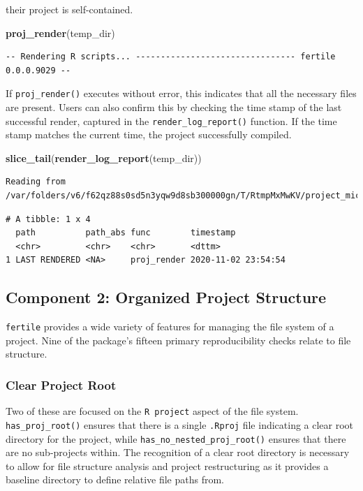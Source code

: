 \documentclass[12pt,twoside]{reedthesis}
\newenvironment{Shaded}{\begin{snugshade}}{\end{snugshade}}
\newcommand{\KeywordTok}[1]{\textcolor[rgb]{0.13,0.29,0.53}{\textbf{#1}}}
\newcommand{\NormalTok}[1]{#1}
\begin{document}
their project is self-contained.
\begin{Shaded}
\begin{Highlighting}[]
\KeywordTok{proj_render}\NormalTok{(temp_dir)}
\end{Highlighting}
\end{Shaded}
\begin{verbatim}
-- Rendering R scripts... -------------------------------- fertile 0.0.0.9029 --
\end{verbatim}
If \texttt{proj\_render()} executes without error, this indicates that
all the necessary files are present. Users can also confirm this by
checking the time stamp of the last successful render, captured in the
\texttt{render\_log\_report()} function. If the time stamp matches the
current time, the project successfully compiled.
\begin{Shaded}
\begin{Highlighting}[]
\KeywordTok{slice_tail}\NormalTok{(}\KeywordTok{render_log_report}\NormalTok{(temp_dir))}
\end{Highlighting}
\end{Shaded}
\begin{verbatim}
Reading from /var/folders/v6/f62qz88s0sd5n3yqw9d8sb300000gn/T/RtmpMxMwKV/project_miceps/.fertile_render_log.csv
\end{verbatim}
\begin{verbatim}
# A tibble: 1 x 4
  path          path_abs func        timestamp          
  <chr>         <chr>    <chr>       <dttm>             
1 LAST RENDERED <NA>     proj_render 2020-11-02 23:54:54
\end{verbatim}
\subsection{Component 2: Organized Project
Structure}\label{component-2-organized-project-structure}

\texttt{fertile} provides a wide variety of features for managing the
file system of a project. Nine of the package's fifteen primary
reproducibility checks relate to file structure.

\subsubsection{Clear Project Root}\label{clear-project-root}

Two of these are focused on the \texttt{R\ project} aspect of the file
system. \texttt{has\_proj\_root()} ensures that there is a single
\texttt{.Rproj} file indicating a clear root directory for the project,
while \texttt{has\_no\_nested\_proj\_root()} ensures that there are no
sub-projects within. The recognition of a clear root directory is
necessary to allow for file structure analysis and project restructuring
as it provides a baseline directory to define relative file paths from.
\end{document}
